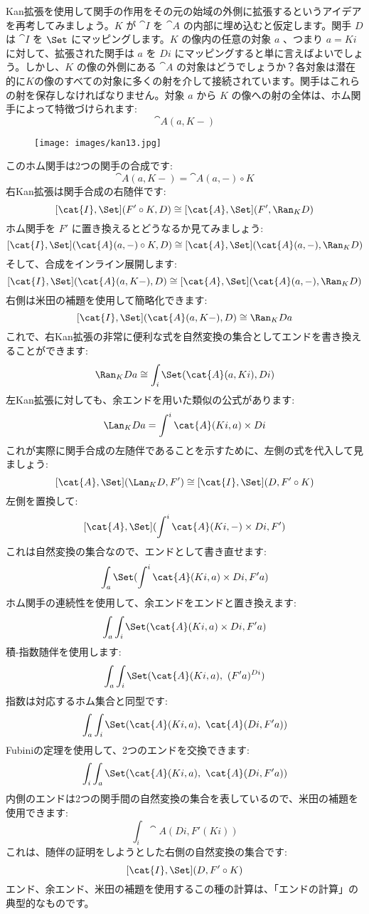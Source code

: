Kan拡張を使用して関手の作用をその元の始域の外側に拡張するというアイデアを再考してみましょう。$K$ が $\cat{I}$ を $\cat{A}$ の内部に埋め込むと仮定します。関手 $D$ は $\cat{I}$ を $\Set$ にマッピングします。$K$ の像内の任意の対象 $a$ 、つまり $a = K i$ に対して、拡張された関手は $a$ を $D i$ にマッピングすると単に言えばよいでしょう。しかし、$K$ の像の外側にある $\cat{A}$ の対象はどうでしょうか？各対象は潜在的に$K$の像のすべての対象に多くの射を介して接続されています。関手はこれらの射を保存しなければなりません。対象 $a$ から $K$ の像への射の全体は、ホム関手によって特徴づけられます:
\[\cat{A}(a, K -)\]

\begin{figure}[H]
  \centering
  \texttt{[image: images/kan13.jpg]}
\end{figure}

\noindent
このホム関手は2つの関手の合成です:
\[\cat{A}(a, K -) = \cat{A}(a, -) \circ K\]
右Kan拡張は関手合成の右随伴です:
\[[\cat{I}, \Set](F' \circ K, D) \cong [\cat{A}, \Set](F', \Ran_{K}D)\]
ホム関手を $F'$ に置き換えるとどうなるか見てみましょう:
\[[\cat{I}, \Set](\cat{A}(a, -) \circ K, D) \cong [\cat{A}, \Set](\cat{A}(a, -), \Ran_{K}D)\]
そして、合成をインライン展開します:
\[[\cat{I}, \Set](\cat{A}(a, K -), D) \cong [\cat{A}, \Set](\cat{A}(a, -), \Ran_{K}D)\]
右側は米田の補題を使用して簡略化できます:
\[[\cat{I}, \Set](\cat{A}(a, K -), D) \cong \Ran_{K}D a\]
これで、右Kan拡張の非常に便利な式を自然変換の集合としてエンドを書き換えることができます:
\[\Ran_{K}D a \cong \int_i \Set(\cat{A}(a, K i), D i)\]
左Kan拡張に対しても、余エンドを用いた類似の公式があります:
\[\Lan_{K}D a = \int^i \cat{A}(K i, a)\times{}D i\]
これが実際に関手合成の左随伴であることを示すために、左側の式を代入して見ましょう:
\[[\cat{A}, \Set](\Lan_{K}D, F') \cong [\cat{I}, \Set](D, F' \circ K)\]
左側を置換して:
\[[\cat{A}, \Set](\int^i \cat{A}(K i, -)\times{}D i, F')\]
これは自然変換の集合なので、エンドとして書き直せます:
\[\int_a \Set(\int^i \cat{A}(K i, a)\times{}D i, F' a)\]
ホム関手の連続性を使用して、余エンドをエンドと置き換えます:
\[\int_a \int_i \Set(\cat{A}(K i, a)\times{}D i, F' a)\]
積-指数随伴を使用します:
\[\int_a \int_i \Set(\cat{A}(K i, a),\ (F' a)^{D i})\]
指数は対応するホム集合と同型です:
\[\int_a \int_i \Set(\cat{A}(K i, a),\ \cat{A}(D i, F' a))\]
Fubiniの定理を使用して、2つのエンドを交換できます:
\[\int_i \int_a \Set(\cat{A}(K i, a),\ \cat{A}(D i, F' a))\]
内側のエンドは2つの関手間の自然変換の集合を表しているので、米田の補題を使用できます:
\[\int_i \cat{A}(D i, F' (K i))\]
これは、随伴の証明をしようとした右側の自然変換の集合です:
\[[\cat{I}, \Set](D, F' \circ K)\]
エンド、余エンド、米田の補題を使用するこの種の計算は、「エンドの計算」の典型的なものです。

